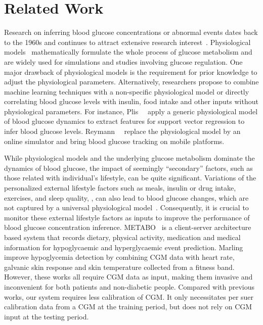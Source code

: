 \section{Related Work}
\label{sec:relwork}
Research on inferring blood glucose concentrations or abnormal events dates back to the 1960s and continues to attract extensive research interest~\cite{bib:IJNMBE16:Oviedo}.
Physiological models~\cite{bib:TBE07:Dalla, bib:PE04:Hovorka} mathematically formulate the whole process of glucose metabolism and are widely used for simulations and studies involving glucose regulation.
One major drawback of physiological models is the requirement for prior knowledge to adjust the physiological parameters.
Alternatively, researchers propose to combine machine learning techniques with a non-specific physiological model or directly correlating blood glucose levels with insulin, food intake and other inputs without physiological parameters.
For instance, Plis~\etal~\cite{bib:MAIHA14:Plis} apply a generic physiological model of blood glucose dynamics to extract features for support vector regression to infer blood glucose levels.
Reymann~\etal~\cite{bib:EMBC16:Reymann} replace the physiological model by an online simulator and bring blood glucose tracking on mobile platforms.

While physiological models and the underlying glucose metabolism dominate the dynamics of blood glucose, the impact of seemingly ``secondary'' factors, such as those related with individual's lifestyle, can be quite significant.
Variations of the personalized external lifestyle factors such as meals, insulin or drug intake, exercises, and sleep quality, \etc, can also lead to blood glucose changes, which are not captured by a universal physiological model~\cite{bib:DRCP15:Iwasaki}.
Consequently, it is crucial to monitor these external lifestyle factors as inputs to improve the performance of blood glucose concentration inference.
METABO~\cite{bib:EMBC09:Georga} is a client-server architecture based system that records dietary, physical activity, medication and medical information for hypoglycaemic and hyperglycaemic event prediction.
Marling~\etal~\cite{bib:KDHealth16:Marling} improve hypoglycemia detection by combining CGM data with heart rate, galvanic skin response and skin temperature collected from a fitness band.
However, these works all require CGM data as input, making them invasive and inconvenient for both patients and non-diabetic people.
\textcolor[rgb]{1.00,0.00,0.00}{Compared with previous works, our system requires less calibration of CGM. It only necessitates per suer calibration data from a CGM at the training period, but does not rely on CGM input at the testing period.}

